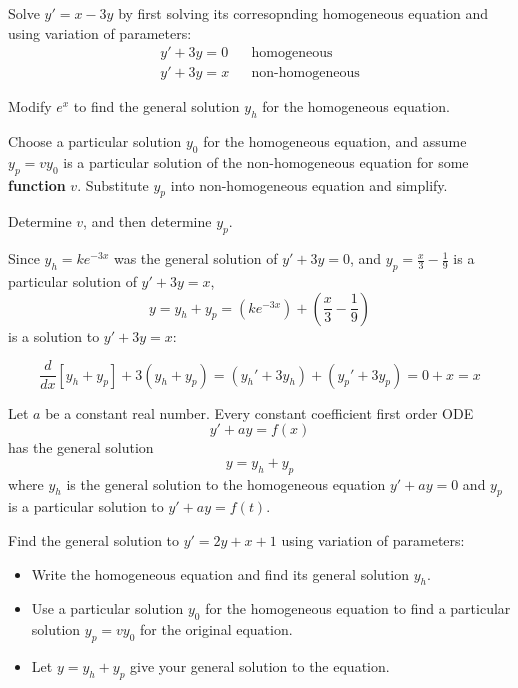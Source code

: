 \begin{applicationActivities}
\begin{activity}{20}
Solve \(y'=x-3y\) by first solving its corresopnding homogeneous equation and using
variation of parameters: 
\begin{align*}
y'+3y = 0 & & \text{homogeneous} \\
y'+3y = x & & \text{non-homogeneous}
\end{align*}
\begin{subactivity}
Modify \(e^x\) to find the general solution \(y_h\) for the homogeneous equation.
\end{subactivity}
\begin{subactivity}
Choose a particular solution \(y_0\) for the homogeneous equation, and
assume \(y_p = v y_0 \) is a particular solution of the non-homogeneous equation for some \textbf{function} \(v\).
Substitute \(y_p\) into non-homogeneous equation and simplify.
\end{subactivity}
\begin{subactivity}
Determine \(v\), and then determine \(y_p\).
\end{subactivity}
\end{activity}

\begin{observation}
Since \(y_h=ke^{-3x}\) was the general solution of \(y'+3y=0\), 
and \(y_p = \frac{x}{3}-\frac{1}{9}\) is a particular solution of \(y'+3y=x\), 
\[y=y_h+y_p = \left(ke^{-3x}\right)+\left(\frac{x}{3}-\frac{1}{9}\right)\]
is a solution to \(y'+3y=x\):

\vfill

\[\frac{d}{dx}[y_h+y_p]+3(y_h+y_p)=(y_h'+3y_h)+(y_p'+3y_p)=0+x=x\]
\end{observation}

\begin{fact}
Let \(a\) be a constant real number.
Every constant coefficient first order ODE
\[y'+ay=f(x)\]
has the general solution
\[y=y_h+y_p\]
where \(y_h\) is the general solution to the homogeneous equation \(y'+ay=0\)
and \(y_p\) is a particular solution to \(y'+ay=f(t)\).
\end{fact}

\begin{activity}{15}
Find the general solution to \(y'=2y+x+1\) using variation of parameters:

\vfill

\begin{itemize}
\item Write the homogeneous equation and find its general solution \(y_h\).
\item Use a particular solution \(y_0\) for the homogeneous equation to find a particular solution
      \(y_p=vy_0\) for the original equation.
\item Let \(y=y_h+y_p\) give your general solution to the equation.
\end{itemize}
\end{activity}





\end{applicationActivities}
